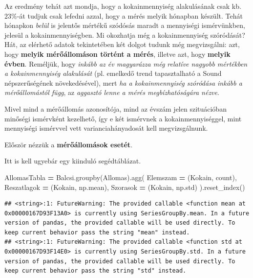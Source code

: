 \documentclass[
]{book}
\newenvironment{Shaded}{\begin{snugshade}}{\end{snugshade}}
\newcommand{\NormalTok}[1]{#1}
\newcommand{\OperatorTok}[1]{\textcolor[rgb]{0.81,0.36,0.00}{\textbf{#1}}}
\newcommand{\StringTok}[1]{\textcolor[rgb]{0.31,0.60,0.02}{#1}}
\begin{document}
Az eredmény tehát azt mondja, hogy a kokainmennyiség alakulásának csak kb. \(23\%\)-át tudjuk csak lefedni azzal, hogy a mérés melyik hónapban készült. Tehát hónapkon \emph{belül} is jelentős mértékű szódósás maradt a mennyiségi ismérvünkben, jelesül a kokainmennyiségben.
Mi okozhatja még a kokainmennyiség szóródását? Hát, az elérhető adatok tekintetében két dolgot tudunk még megvizsgálni: azt, hogy \textbf{melyik mérőállomáson történt a mérés}, illetve azt, hogy \textbf{melyik évben}. Reméljük, hogy \emph{inkább az év magyarázza még relatíve nagyobb mértékben a kokainmennyiség alakulását} (pl. emelkedő trend tapasztalható a Sound népszerűségének növekedésével), mert \emph{ha a kokainmennyiség szóródása inkább a mérőállomástól függ}, az \emph{aggasztó lenne a mérés megbízhatóságára nézve}.

Mivel mind a mérőállomás azonosítója, mind az évszám jelen szituációban minőségi ismérvként kezelhető, így e két ismérvnek a kokainmennyiséggel, mint mennyiségi ismérvvel vett varianciahányadosát kell megvizsgálnunk.

Először nézzük a \textbf{mérőállomások esetét}.

Itt is kell ugyebár egy kiinduló segédtáblázat.

\begin{Shaded}
\begin{Highlighting}[]
\NormalTok{AllomasTabla }\OperatorTok{=}\NormalTok{ Balcsi.groupby(}\StringTok{\textquotesingle{}Allomas\textquotesingle{}}\NormalTok{).agg(}
\NormalTok{  Elemszam }\OperatorTok{=}\NormalTok{ (}\StringTok{\textquotesingle{}Kokain\textquotesingle{}}\NormalTok{, }\StringTok{\textquotesingle{}count\textquotesingle{}}\NormalTok{),}
\NormalTok{  Reszatlagok }\OperatorTok{=}\NormalTok{ (}\StringTok{\textquotesingle{}Kokain\textquotesingle{}}\NormalTok{, np.mean),}
\NormalTok{  Szorasok }\OperatorTok{=}\NormalTok{ (}\StringTok{\textquotesingle{}Kokain\textquotesingle{}}\NormalTok{, np.std)}
\NormalTok{).reset\_index()}
\end{Highlighting}
\end{Shaded}

\begin{verbatim}
## <string>:1: FutureWarning: The provided callable <function mean at 0x00000167D93F13A0> is currently using SeriesGroupBy.mean. In a future version of pandas, the provided callable will be used directly. To keep current behavior pass the string "mean" instead.
## <string>:1: FutureWarning: The provided callable <function std at 0x00000167D93F14E0> is currently using SeriesGroupBy.std. In a future version of pandas, the provided callable will be used directly. To keep current behavior pass the string "std" instead.
\end{verbatim}
\end{document}

